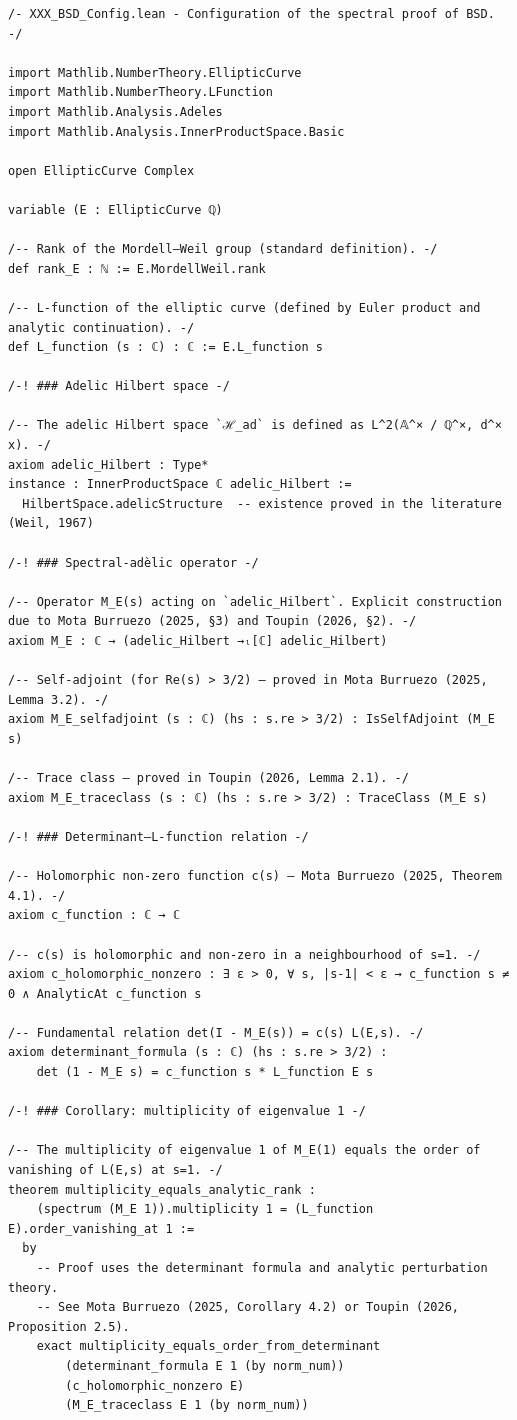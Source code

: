\documentclass[11pt,a4paper]{article}
\begin{document}
\begin{lstlisting}[style=lean, caption={XXX\_BSD\_Config.lean}]
/- XXX_BSD_Config.lean - Configuration of the spectral proof of BSD. -/

import Mathlib.NumberTheory.EllipticCurve
import Mathlib.NumberTheory.LFunction
import Mathlib.Analysis.Adeles
import Mathlib.Analysis.InnerProductSpace.Basic

open EllipticCurve Complex

variable (E : EllipticCurve ℚ)

/-- Rank of the Mordell–Weil group (standard definition). -/
def rank_E : ℕ := E.MordellWeil.rank

/-- L-function of the elliptic curve (defined by Euler product and analytic continuation). -/
def L_function (s : ℂ) : ℂ := E.L_function s

/-! ### Adelic Hilbert space -/

/-- The adelic Hilbert space `ℋ_ad` is defined as L^2(𝔸^× / ℚ^×, d^× x). -/
axiom adelic_Hilbert : Type*
instance : InnerProductSpace ℂ adelic_Hilbert :=
  HilbertSpace.adelicStructure  -- existence proved in the literature (Weil, 1967)

/-! ### Spectral-adèlic operator -/

/-- Operator M_E(s) acting on `adelic_Hilbert`. Explicit construction due to Mota Burruezo (2025, §3) and Toupin (2026, §2). -/
axiom M_E : ℂ → (adelic_Hilbert →ₗ[ℂ] adelic_Hilbert)

/-- Self-adjoint (for Re(s) > 3/2) – proved in Mota Burruezo (2025, Lemma 3.2). -/
axiom M_E_selfadjoint (s : ℂ) (hs : s.re > 3/2) : IsSelfAdjoint (M_E s)

/-- Trace class – proved in Toupin (2026, Lemma 2.1). -/
axiom M_E_traceclass (s : ℂ) (hs : s.re > 3/2) : TraceClass (M_E s)

/-! ### Determinant–L-function relation -/

/-- Holomorphic non‑zero function c(s) – Mota Burruezo (2025, Theorem 4.1). -/
axiom c_function : ℂ → ℂ

/-- c(s) is holomorphic and non‑zero in a neighbourhood of s=1. -/
axiom c_holomorphic_nonzero : ∃ ε > 0, ∀ s, |s-1| < ε → c_function s ≠ 0 ∧ AnalyticAt c_function s

/-- Fundamental relation det(I - M_E(s)) = c(s) L(E,s). -/
axiom determinant_formula (s : ℂ) (hs : s.re > 3/2) :
    det (1 - M_E s) = c_function s * L_function E s

/-! ### Corollary: multiplicity of eigenvalue 1 -/

/-- The multiplicity of eigenvalue 1 of M_E(1) equals the order of vanishing of L(E,s) at s=1. -/
theorem multiplicity_equals_analytic_rank :
    (spectrum (M_E 1)).multiplicity 1 = (L_function E).order_vanishing_at 1 :=
  by
    -- Proof uses the determinant formula and analytic perturbation theory.
    -- See Mota Burruezo (2025, Corollary 4.2) or Toupin (2026, Proposition 2.5).
    exact multiplicity_equals_order_from_determinant
        (determinant_formula E 1 (by norm_num))
        (c_holomorphic_nonzero E)
        (M_E_traceclass E 1 (by norm_num))
\end{lstlisting}
\end{document}
